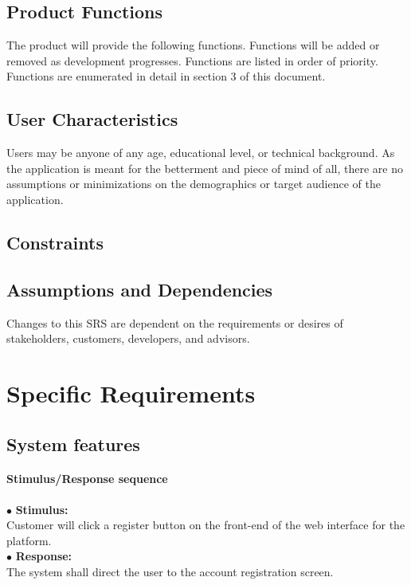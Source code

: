 \documentclass{scrreprt}
\begin{document}
\section{Product Functions}
The product will provide the following functions. Functions will be added or removed as 
development progresses. Functions are listed in order of priority. Functions are enumerated in detail in section 3 of this document.


\section{User Characteristics}
Users may be anyone of any age, educational level, or technical background. As the application is meant for the betterment and piece of mind of all, there are no assumptions or minimizations on the demographics or target audience of the application.


\section{Constraints}


\section{Assumptions and Dependencies}
Changes to this SRS are dependent on the requirements or desires of stakeholders, customers, developers, and advisors. 


\chapter{Specific Requirements}

\section{System features}


\subsubsection{Stimulus/Response sequence}
\vspace{5mm}
	$\bullet$ \textbf{Stimulus:} \\ \hspace{5mm} Customer will click a register button on the front-end of the web interface for the platform.\\
	$\bullet$ \textbf{Response:} \\ \hspace{5mm} The system shall direct the user to the account registration screen.
\end{document}

